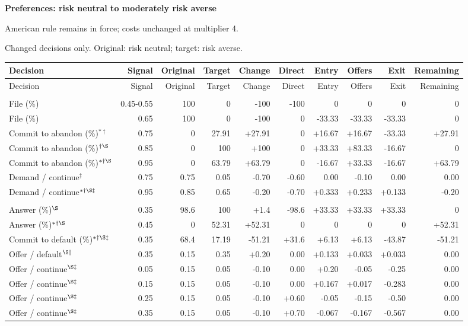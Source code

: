 \documentclass[10pt]{article}
\begin{document}
{\large\bfseries Preferences: risk neutral to moderately risk averse}\par
American rule remains in force; costs unchanged at multiplier 4.\par
{\small Changed decisions only. Original: risk neutral; target: risk averse.}\par
{\small\setlength{\tabcolsep}{3pt}\begin{longtable}{@{}>{\raggedright\arraybackslash}p{1.65in}rrrrrrrrr@{}}
\toprule Decision & Signal & Original & Target & Change & Direct & Entry & Offers & Exit & Remaining \\\midrule\endfirsthead
\toprule Decision & Signal & Original & Target & Change & Direct & Entry & Offers & Exit & Remaining \\\midrule\endhead
\bottomrule\endfoot
\multicolumn{10}{@{}l}{\textbf{Plaintiff}}\\
File (\%) & 0.45-0.55 & 100 & 0 & -100 & -100 & 0 & 0 & 0 & 0\\
File (\%) & 0.65 & 100 & 0 & -100 & 0 & -33.33 & -33.33 & -33.33 & 0\\
Commit to abandon (\%)$^{*\dagger}$ & 0.75 & 0 & 27.91 & +27.91 & 0 & +16.67 & +16.67 & -33.33 & +27.91\\
Commit to abandon (\%)$^{\dagger\S}$ & 0.85 & 0 & 100 & +100 & 0 & +33.33 & +83.33 & -16.67 & 0\\
Commit to abandon (\%)$^{*\dagger\S}$ & 0.95 & 0 & 63.79 & +63.79 & 0 & -16.67 & +33.33 & -16.67 & +63.79\\
Demand / continue$^{\ddagger}$ & 0.75 & 0.75 & 0.05 & -0.70 & -0.60 & 0.00 & -0.10 & 0.00 & 0.00\\
Demand / continue$^{*\dagger\S\ddagger}$ & 0.95 & 0.85 & 0.65 & -0.20 & -0.70 & +0.333 & +0.233 & +0.133 & -0.20\\
\multicolumn{10}{@{}l}{\textbf{Defendant}}\\
Answer (\%)$^{\S}$ & 0.35 & 98.6 & 100 & +1.4 & -98.6 & +33.33 & +33.33 & +33.33 & 0\\
Answer (\%)$^{*\dagger\S}$ & 0.45 & 0 & 52.31 & +52.31 & 0 & 0 & 0 & 0 & +52.31\\
Commit to default (\%)$^{*\dagger\S\ddagger}$ & 0.35 & 68.4 & 17.19 & -51.21 & +31.6 & +6.13 & +6.13 & -43.87 & -51.21\\
Offer / default$^{\S\ddagger}$ & 0.35 & 0.15 & 0.35 & +0.20 & 0.00 & +0.133 & +0.033 & +0.033 & 0.00\\
Offer / continue$^{\S\ddagger}$ & 0.05 & 0.15 & 0.05 & -0.10 & 0.00 & +0.20 & -0.05 & -0.25 & 0.00\\
Offer / continue$^{\S\ddagger}$ & 0.15 & 0.15 & 0.05 & -0.10 & 0.00 & +0.167 & +0.017 & -0.283 & 0.00\\
Offer / continue$^{\S\ddagger}$ & 0.25 & 0.15 & 0.05 & -0.10 & +0.60 & -0.05 & -0.15 & -0.50 & 0.00\\
Offer / continue$^{\S\ddagger}$ & 0.35 & 0.15 & 0.05 & -0.10 & +0.70 & -0.067 & -0.167 & -0.567 & 0.00\\
\end{longtable}}
\end{document}
